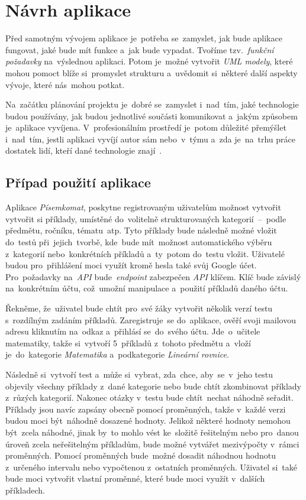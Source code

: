 \documentclass[11pt,a4paper]{report}
\let\oldacrshort\acrshort
\renewcommand{\acrshort}[1]{\emph{\normalsize\color[rgb]{0,0,0}\noindent\oldacrshort{#1}}}
\begin{document}
	\chapter{Návrh aplikace}
        Před samotným vývojem aplikace je~potřeba se~zamyslet, jak bude aplikace fungovat, jaké bude mít funkce a~jak bude vypadat. Tvoříme tzv.~\emph{funkční požadavky} na~výslednou aplikaci. Potom je~možné vytvořit \emph{UML modely}, které mohou pomoct blíže si~promyslet strukturu a~uvědomit si~některé další aspekty vývoje, které nás~mohou potkat.

        Na~začátku plánování projektu je~dobré se~zamyslet i~nad~tím, jaké technologie budou používány, jak budou jednotlivé součásti komunikovat a~jakým způsobem je~aplikace vyvíjena. V~profesionálním prostředí je~potom důležité přemýšlet i~nad~tím, jestli aplikaci vyvíjí autor sám nebo~v~týmu a~zda je~na~trhu práce dostatek lidí, kteří dané technologie znají~\cite{bctynovsky:specifikacepozadavku}.

        \section{Případ použití aplikace}
            Aplikace \emph{Písemkomat}, poskytne registrovaným uživatelům možnost vytvořit vytvořit si příklady, umístěné do~volitelně strukturovaných kategorií~--~podle předmětu, ročníku, tématu~atp. Tyto příklady bude následně možné vložit do~testů při~jejich~tvorbě, kde~bude mít~možnost automatického výběru z~kategorií nebo~konkrétních příkladů a~ty~potom do~testu vložit. Uživatelé budou pro~přihlášení moci využít kromě hesla také svůj Google účet. Pro~požadavky na~\acrshort{API} bude~\emph{endpoint} zabezpečen \acrshort{API} klíčem. Klíč bude závislý na~konkrétním účtu, což~umožní manipulace a~použití příkladů daného účtu.
            
            Řekněme, že~uživatel bude chtít pro~své žáky vytvořit několik verzí testu s~rozdílným zadáním příkladů. Zaregistruje~se do~aplikace, ověří svoji mailovou adresu kliknutím na~odkaz a~přihlásí se~do~svého účtu. Jde~o~učitele matematiky, takže si~vytvoří 5~příkladů z~tohoto předmětu a~vloží je~do~kategorie \emph{Matematika} a~podkategorie \emph{Lineární rovnice}.

            Následně si~vytvoří test a~může si~vybrat, zda~chce, aby~se~v~jeho testu objevily všechny příklady z~dané kategorie nebo bude chtít zkombinovat příklady z~růzých kategorií. Nakonec otázky v~testu bude chtít~nechat náhodně seřadit. Příklady jsou navíc zapsány obecně pomocí proměnných, takže v~každé verzi budou moci být~náhodně dosazené hodnoty. Jelikož některé hodnoty nemohou být~zcela náhodné, jinak by~to mohlo vést ke~složitě řešitelným nebo pro~danou úroveň zcela neřešitelným příkladům, bude možné vytvářet mezivýpočty v~rámci proměnných. Pomocí proměnných bude~možné dosadit náhodnou hodnotu z~určeného intervalu nebo vypočtenou z~ostatních proměnných. Uživatel si~také bude moci vytvořit vlastní proměnné, které bude moci využít v~dalších příkladech. 
\end{document}
